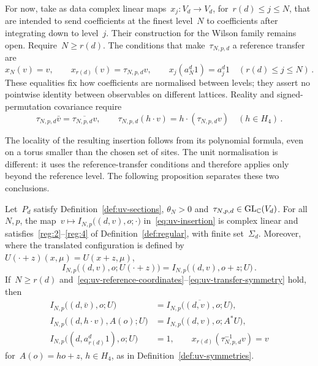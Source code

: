 For now, take as data complex linear maps~$x_j:V_d\to V_d$, for~$r(d)\le j\le N$, that are intended to send coefficients at the finest level~$N$ to coefficients after integrating down to level~$j$. Their construction for the Wilson family remains open. Require~$N\ge r(d)$.
The conditions that make~$\tau_{N,p,d}$ a reference transfer are
\begin{equation}\label{eq:uv-reference-coordinates}
 x_N(v)=v,\qquad x_{r(d)}(v)=\tau_{N,p,d}v,\qquad
 x_j(a_N^d1)=a_j^d1\quad(r(d)\le j\le N)\,.
\end{equation}
These equalities fix how coefficients are normalised between levels; they assert no pointwise identity between observables on different lattices.
Reality and signed-permutation covariance require
\begin{equation}\label{eq:uv-transfer-symmetry}
 \tau_{N,p,d}\bar v=\overline{\tau_{N,p,d}v},\qquad
 \tau_{N,p,d}(h\cdot v)=h\cdot(\tau_{N,p,d}v)\quad(h\in H_4)\,.
\end{equation}

The locality of the resulting insertion follows from its polynomial formula, even on a torus smaller than the chosen set of sites.
The unit normalisation is different: it uses the reference-transfer conditions and therefore applies only beyond the reference level.
The following proposition separates these two conclusions.

\begin{proposition}\label{prop:uv-insertions}
Let~$P_d$ satisfy Definition~\ref{def:uv-sections}, $\theta_N>0$ and~$\tau_{N,p,d}\in\mathrm{GL}_\mathbb C(V_d)$.
For all~$N,p$, the map~$v\mapsto I_{N,p}\bigl((d,v),o;\cdot\bigr)$ in~\eqref{eq:uv-insertion} is complex linear and satisfies~\ref{reg:2}--\ref{reg:4} of Definition~\ref{def:regular}, with finite set~$\Sigma_d$.
Moreover, where the translated configuration is defined by~$U(\cdot+z)(x,\mu)=U(x+z,\mu)$,
\begin{equation}\label{eq:uv-insertion-translation}
 I_{N,p}\bigl((d,v),o;U(\cdot+z)\bigr)=I_{N,p}\bigl((d,v),o+z;U\bigr)\,.
\end{equation}
If~$N\ge r(d)$ and~\eqref{eq:uv-reference-coordinates}--\eqref{eq:uv-transfer-symmetry} hold, then
\begin{equation}\label{eq:uv-insertion-covariance}
 \begin{aligned}
 I_{N,p}\bigl((d,\bar v),o;U\bigr)&=\overline{I_{N,p}\bigl((d,v),o;U\bigr)},\\
 I_{N,p}\bigl((d,h\cdot v),A(o);U\bigr)&=I_{N,p}\bigl((d,v),o;A^*U\bigr),\\
 I_{N,p}\bigl((d,a_{r(d)}^d1),o;U\bigr)&=1,\qquad
 x_{r(d)}(\tau_{N,p,d}^{-1}v)=v
 \end{aligned}
\end{equation}
for~$A(o)=ho+z$, $h\in H_4$, as in Definition~\ref{def:uv-symmetries}.
\end{proposition}

